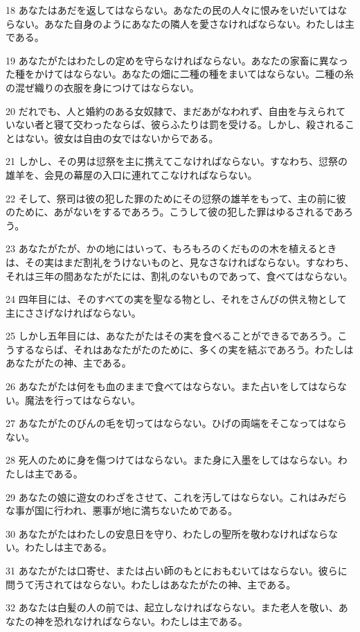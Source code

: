 \par 18 あなたはあだを返してはならない。あなたの民の人々に恨みをいだいてはならない。あなた自身のようにあなたの隣人を愛さなければならない。わたしは主である。
\par 19 あなたがたはわたしの定めを守らなければならない。あなたの家畜に異なった種をかけてはならない。あなたの畑に二種の種をまいてはならない。二種の糸の混ぜ織りの衣服を身につけてはならない。
\par 20 だれでも、人と婚約のある女奴隷で、まだあがなわれず、自由を与えられていない者と寝て交わったならば、彼らふたりは罰を受ける。しかし、殺されることはない。彼女は自由の女ではないからである。
\par 21 しかし、その男は愆祭を主に携えてこなければならない。すなわち、愆祭の雄羊を、会見の幕屋の入口に連れてこなければならない。
\par 22 そして、祭司は彼の犯した罪のためにその愆祭の雄羊をもって、主の前に彼のために、あがないをするであろう。こうして彼の犯した罪はゆるされるであろう。
\par 23 あなたがたが、かの地にはいって、もろもろのくだものの木を植えるときは、その実はまだ割礼をうけないものと、見なさなければならない。すなわち、それは三年の間あなたがたには、割礼のないものであって、食べてはならない。
\par 24 四年目には、そのすべての実を聖なる物とし、それをさんびの供え物として主にささげなければならない。
\par 25 しかし五年目には、あなたがたはその実を食べることができるであろう。こうするならば、それはあなたがたのために、多くの実を結ぶであろう。わたしはあなたがたの神、主である。
\par 26 あなたがたは何をも血のままで食べてはならない。また占いをしてはならない。魔法を行ってはならない。
\par 27 あなたがたのびんの毛を切ってはならない。ひげの両端をそこなってはならない。
\par 28 死人のために身を傷つけてはならない。また身に入墨をしてはならない。わたしは主である。
\par 29 あなたの娘に遊女のわざをさせて、これを汚してはならない。これはみだらな事が国に行われ、悪事が地に満ちないためである。
\par 30 あなたがたはわたしの安息日を守り、わたしの聖所を敬わなければならない。わたしは主である。
\par 31 あなたがたは口寄せ、または占い師のもとにおもむいてはならない。彼らに問うて汚されてはならない。わたしはあなたがたの神、主である。
\par 32 あなたは白髪の人の前では、起立しなければならない。また老人を敬い、あなたの神を恐れなければならない。わたしは主である。
